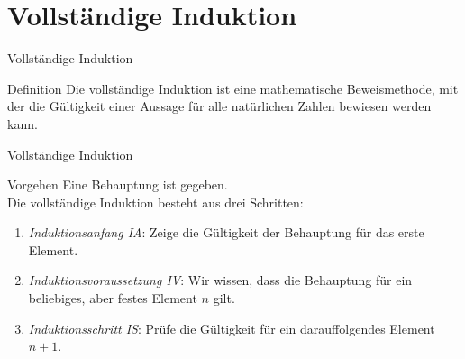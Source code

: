 \section{Vollständige Induktion}
\begin{frame}{Vollständige Induktion}
    \begin{block}{Definition}
        Die vollständige Induktion ist eine mathematische Beweismethode, mit der die Gültigkeit einer Aussage für alle natürlichen Zahlen bewiesen werden kann.
    \end{block}
\end{frame}
\begin{frame}{Vollständige Induktion}
    \begin{block}{Vorgehen}
        Eine Behauptung ist gegeben.\\\pause
        Die vollständige Induktion besteht aus drei Schritten:
        \begin{enumerate}
            \item \emph{Induktionsanfang IA}: Zeige die Gültigkeit der Behauptung für das erste Element.
                \pause
            \item \emph{Induktionsvoraussetzung IV}: Wir wissen, dass die Behauptung für ein beliebiges, aber festes Element $n$ gilt.
                \pause
            \item \emph{Induktionsschritt IS}: Prüfe die Gültigkeit für ein darauffolgendes Element $n+1$.
        \end{enumerate}
    \end{block}
\end{frame}

